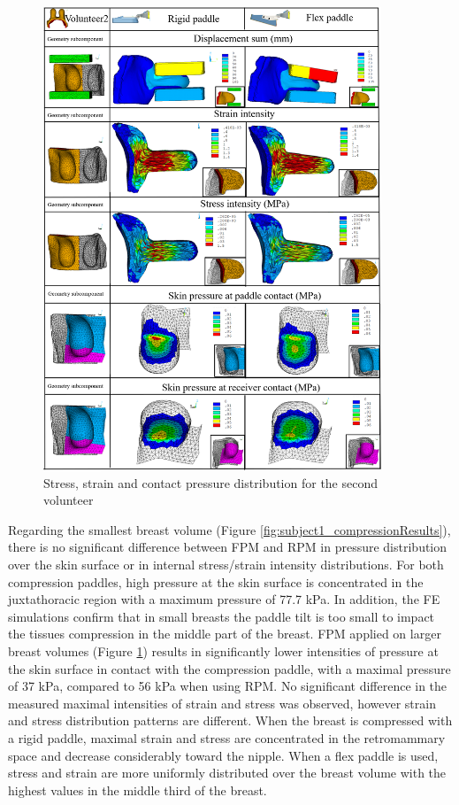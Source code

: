 \begin{figure}[h!]
\centering
\includegraphics[width=0.9\textwidth,keepaspectratio]{figures/subject2_compressionResults.png} 
\caption{Stress, strain and contact pressure distribution for the second volunteer}\label{fig:subject2_compressionResults}
\end{figure}


Regarding the smallest breast volume (Figure \ref{fig:subject1_compressionResults}), there is no significant difference between FPM and RPM in pressure distribution over the skin surface or in internal stress/strain intensity distributions. For both compression paddles, high pressure at the skin surface is concentrated in the juxtathoracic region with a maximum pressure of 77.7 kPa. In addition, the FE simulations confirm that in small breasts the paddle tilt is too small to impact the tissues compression in the middle part of the breast. FPM applied on larger breast volumes (Figure \ref{fig:subject2_compressionResults}) results in significantly lower intensities of pressure at the skin surface in contact with the compression paddle, with a maximal pressure of 37 kPa, compared to 56 kPa when using RPM. No significant difference in the measured maximal intensities of strain and stress was observed, however strain and stress distribution patterns are different. When the breast is compressed with a rigid paddle, maximal strain and stress are concentrated in the retromammary space and decrease considerably toward the nipple. When a flex paddle is used, stress and strain are more uniformly distributed over the breast volume with the highest values in the middle third of the breast.

